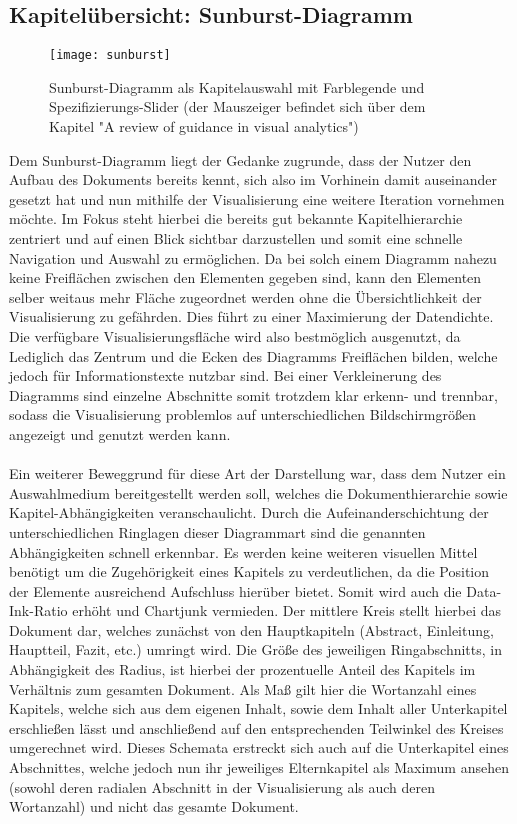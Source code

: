 \subsection{Kapitel\"ubersicht: Sunburst-Diagramm} \label{subsec:sunburst}
\begin{figure}[!htbp]
 \centering
 \texttt{[image: sunburst]}
 \caption{Sunburst-Diagramm als Kapitelauswahl mit Farblegende und Spezifizierungs-Slider (der Mauszeiger befindet sich \"uber dem Kapitel "A review of guidance in visual analytics")}
 \label{fig:overview}
\end{figure}
Dem Sunburst-Diagramm liegt der Gedanke zugrunde, dass der Nutzer den Aufbau des Dokuments bereits kennt, sich also im Vorhinein damit auseinander gesetzt hat und nun mithilfe der Visualisierung eine weitere Iteration vornehmen m\"ochte. Im Fokus steht hierbei die bereits gut bekannte Kapitelhierarchie zentriert und auf einen Blick sichtbar darzustellen und somit eine schnelle Navigation und Auswahl zu erm\"oglichen. Da bei solch einem Diagramm nahezu keine Freifl\"achen zwischen den Elementen gegeben sind, kann den Elementen selber weitaus mehr Fl\"ache zugeordnet werden ohne die \"Ubersichtlichkeit der Visualisierung zu gef\"ahrden. Dies f\"uhrt zu einer Maximierung der Datendichte. Die verf\"ugbare Visualisierungsfl\"ache wird also bestm\"oglich ausgenutzt, da Lediglich das Zentrum und die Ecken des Diagramms Freifl\"achen bilden, welche jedoch f\"ur Informationstexte nutzbar sind. Bei einer Verkleinerung des Diagramms sind einzelne Abschnitte somit trotzdem klar erkenn- und trennbar, sodass die Visualisierung problemlos auf unterschiedlichen Bildschirmgr\"o{\ss}en angezeigt und genutzt werden kann.\\
\\
Ein weiterer Beweggrund f\"ur diese Art der Darstellung war, dass dem Nutzer ein Auswahlmedium bereitgestellt werden soll, welches die Dokumenthierarchie sowie Kapitel-Abh\"angigkeiten veranschaulicht. Durch die Aufeinanderschichtung der unterschiedlichen Ringlagen dieser Diagrammart sind die genannten Abh\"angigkeiten schnell erkennbar. Es werden keine weiteren visuellen Mittel ben\"otigt um die Zugeh\"origkeit eines Kapitels zu verdeutlichen, da die Position der Elemente ausreichend Aufschluss hier\"uber bietet. Somit wird auch die Data-Ink-Ratio erh\"oht und Chartjunk vermieden. Der mittlere Kreis stellt hierbei das Dokument dar, welches zun\"achst von den Hauptkapiteln (Abstract, Einleitung, Hauptteil, Fazit, etc.) umringt wird. Die Gr\"o{\ss}e des jeweiligen Ringabschnitts, in Abh\"angigkeit des Radius, ist hierbei der prozentuelle Anteil des Kapitels im Verh\"altnis zum gesamten Dokument. Als Ma{\ss} gilt hier die Wortanzahl eines Kapitels, welche sich aus dem eigenen Inhalt, sowie dem Inhalt aller Unterkapitel erschlie{\ss}en l\"asst und anschlie{\ss}end auf den entsprechenden Teilwinkel des Kreises umgerechnet wird. Dieses Schemata erstreckt sich auch auf die Unterkapitel eines Abschnittes, welche jedoch nun ihr jeweiliges Elternkapitel als Maximum ansehen (sowohl deren radialen Abschnitt in der Visualisierung als auch deren Wortanzahl) und nicht das gesamte Dokument.\\

